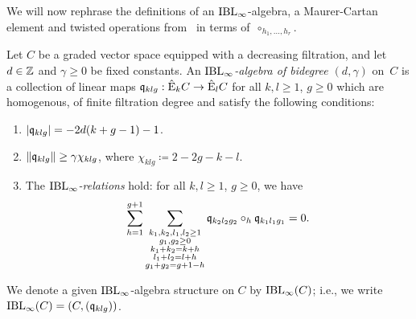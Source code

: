 \documentclass[\MainFolder/Text.tex]{subfiles}
\begin{document}
We will now rephrase the definitions of an $\mathrm{IBL}_\infty$-algebra, a Maurer-Cartan element and twisted operations from~\cite{Cieliebak2015} in terms of~$\circ_{h_1, \dotsc, h_r}$.
\begin{Def} \label{Def:IBLInfty} Let $C$ be a graded vector space equipped with a decreasing filtration, and let $d\in \mathbb{Z}$ and $\gamma\ge 0$ be fixed constants. An \emph{$\mathrm{IBL}_\infty$-algebra of bidegree $(d,\gamma)$} on~$C$ is a collection of linear maps $\mathfrak{q}_{klg}: \hat{\mathrm{E}}_k C \rightarrow \hat{\mathrm{E}}_l C$ for all $k,l\ge 1$, $g\ge 0$ which are homogenous, of finite filtration degree and satisfy the following conditions: 
\begin{enumerate}[label=\arabic*)]
\item $|\mathfrak{q}_{klg}| = - 2d(k+g-1) - 1$.
\item $\| \mathfrak{q}_{klg} \| \ge \gamma \chi_{klg}$,
where $\chi_{klg}\coloneqq2-2g-k-l$. %
\item The \emph{$\mathrm{IBL}_\infty$-relations} hold: for all $k,l\ge 1$, $g\ge 0$, we have
\begin{equation} \label{Eq:IBLInfRel}
\sum_{h=1}^{g+1} \sum_{\substack{k_1, k_2, l_1, l_2 \ge 1 \\ g_1, g_2 \ge 0 \\k_1 + k_2 = k + h \\ l_1 + l_2 = l+ h\\ g_1 + g_2 = g+ 1 -h }} \mathfrak{q}_{k_2 l_2 g_2} \circ_h \mathfrak{q}_{k_1 l_1 g_1} = 0.
\end{equation}
\end{enumerate}
We denote a given $\mathrm{IBL}_\infty$-algebra structure on $C$ by $\mathrm{IBL}_\infty(C)$; i.e., we write $\mathrm{IBL}_\infty(C)=(C,(\mathfrak{q}_{klg}))$.


\end{Def}
\end{document}
